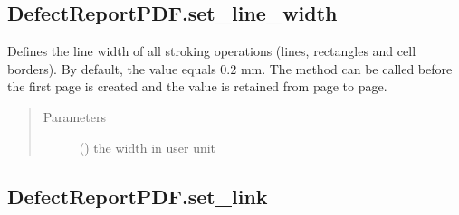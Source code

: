 \documentclass[letterpaper,10pt,english]{sphinxmanual}
\begin{document}
\begin{fulllineitems}
\begin{fulllineitems}
\begin{quote}
\begin{description}
\end{description}\end{quote}

\end{fulllineitems}



\subsection{DefectReportPDF.set\_line\_width}
\label{\detokenize{generated/quality_assessment.quality_pdf_report.DefectReportPDF.set_line_width:defectreportpdf-set-line-width}}\label{\detokenize{generated/quality_assessment.quality_pdf_report.DefectReportPDF.set_line_width::doc}}

\begin{fulllineitems}
\label{\detokenize{generated/quality_assessment.quality_pdf_report.DefectReportPDF.set_line_width:quality_assessment.quality_pdf_report.DefectReportPDF.set_line_width}}
\sphinxAtStartPar
Defines the line width of all stroking operations (lines, rectangles and cell borders).
By default, the value equals 0.2 mm.
The method can be called before the first page is created and the value is retained from page to page.
\begin{quote}\begin{description}
\item[{Parameters}] \leavevmode
\sphinxAtStartPar
{} () \textendash{} the width in user unit

\end{description}\end{quote}

\end{fulllineitems}



\subsection{DefectReportPDF.set\_link}
\label{\detokenize{generated/quality_assessment.quality_pdf_report.DefectReportPDF.set_link:defectreportpdf-set-link}}\label{\detokenize{generated/quality_assessment.quality_pdf_report.DefectReportPDF.set_link::doc}}


\end{fulllineitems}
\end{document}
